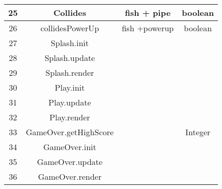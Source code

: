 \documentclass[11pt, oneside]{article}   	%
\begin{document}
\begin{table}[H]
\begin{center}
\begin{tabular}{|c|c|c|c|}
25 & Collides & fish + pipe & boolean\\
\hline
26 & collidesPowerUp & fish +powerup & boolean\\
\hline
27 & Splash.init &  & \\
\hline
28 & Splash.update &  & \\
\hline
29 & Splash.render & & \\
\hline
30 & Play.init & & \\
\hline
31 & Play.update  &  & \\
\hline
32 & Play.render &  & \\
\hline
33 & GameOver.getHighScore &  & Integer\\
\hline
34 & GameOver.init &  & \\
\hline
35 & GameOver.update &  & \\
\hline
36 & GameOver.render &  & \\
\hline



\end{tabular}
\end{center}
\label{default}
\end{table}%
\end{document}
